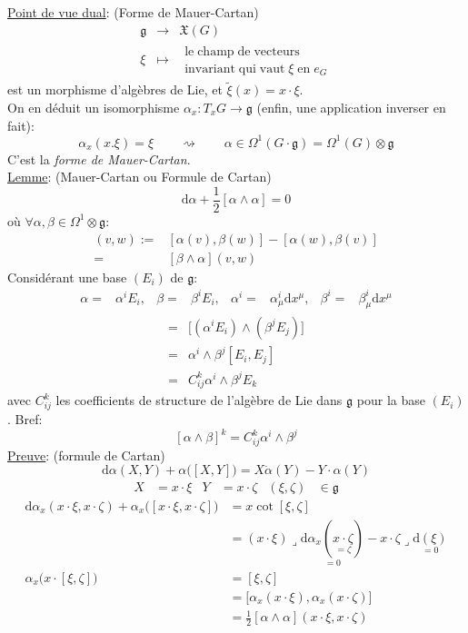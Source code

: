 \documentclass[a4paper,11pt]{article}
\renewcommand{\d}{{\mathrm{d}}}
\begin{document}
\noindent \underline{Point de vue dual}: (Forme de Mauer-Cartan)
$$\begin{matrix}
\mathfrak{g} & \to & \mathfrak{X}(G)\\
\xi & \mapsto & \begin{matrix}
\mathrm{le}\;\mathrm{champ}\;\mathrm{de}\;\mathrm{vecteurs}\\
\mathrm{invariant}\;\mathrm{qui}\;\mathrm{vaut}\;\xi\;\mathrm{en}\;e_G
\end{matrix}
\end{matrix}$$
est un morphisme d'algèbres de Lie, et $\tilde \xi (x) = x \cdot \xi$.\\
On en déduit un isomorphisme $\alpha_x : T_x G \to \mathfrak{g}$ (enfin, une application inverser en fait):
$$\alpha_x (x.\xi)= \xi \quad \quad \rightsquigarrow \quad\quad \alpha \in \Omega^1 (G\cdot \mathfrak{g}) = \Omega^1(G)\otimes \mathfrak{g}$$
C'est la \emph{forme de Mauer-Cartan}.
\\
\underline{Lemme}: (Mauer-Cartan ou Formule de Cartan)
$$\d \alpha + \frac{1}{2} [\alpha \wedge \alpha] = 0$$
où $\forall \alpha, \beta \in \Omega^1 \otimes \mathfrak{g}$:
\begin{align*}
[\alpha \wedge \beta ] (v,w) :=& [\alpha(v),\beta(w)] - [\alpha(w),\beta(v)]\\ =& [\beta\wedge\alpha](v,w)
\end{align*}
Considérant une base $(E_i)$ de $\mathfrak{g}$:
\begin{align*}
\alpha =& \alpha^i E_i, &\beta =& \beta^i E_i, &\alpha^i =& \alpha^i_\mu \d x^\mu, &\beta^i =& \beta^i_\mu \d x^\mu
\end{align*}
\begin{align*}
[\alpha\wedge\beta] =& \big[(\alpha^i E_i)\wedge(\beta^jE_j)\big]\\
=& \alpha^i\wedge\beta^j [E_i,E_j]\\
=& C^k_{ij} \alpha^i \wedge \beta^j E_k
\end{align*}
avec $C^k_{ij}$ les coefficients de structure de l'algèbre de Lie dans $\mathfrak{g}$ pour la base $(E_i)$. Bref:
$$[\alpha\wedge\beta]^k = C^k_{ij} \alpha^i \wedge \beta^j$$
\underline{Preuve}: (formule de Cartan)
$$\d \alpha (X,Y) + \alpha\big([X,Y]\big) = X\dot \alpha(Y) - Y\cdot \alpha(Y)$$
\begin{align*}
X &= x\cdot \xi & Y&= x \cdot \zeta & (\xi,\zeta)&\in \mathfrak{g}
\end{align*}
\begin{align*}
\d \alpha_x (x\cdot \xi, x \cdot \zeta) + \alpha_x \big([x\cdot \xi, x\cdot \zeta]\big) &= x \cot [\xi, \zeta]\\
&= (x\cdot\xi) \lrcorner \underset{=0}{\d\alpha_x(\underset{=\zeta}{x\cdot\zeta})} - x\cdot \zeta \lrcorner \underset{=0}{\d (\xi)}\\
\alpha_x\big(x\cdot[\xi,\zeta]\big) &= [\xi,\zeta]\\
&= \big[\alpha_x (x\cdot\xi), \alpha_x(x\cdot \zeta)\big]\\
&=\frac{1}{2} [\alpha\wedge\alpha] (x\cdot \xi, x \cdot \zeta)
\end{align*}
\end{document}
